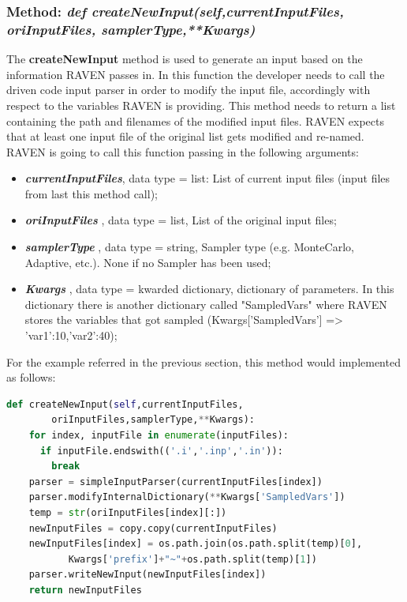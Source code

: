 \subsubsection{Method: \textit{def createNewInput(self,currentInputFiles,
                                       \\oriInputFiles, samplerType,**Kwargs)}} 
\label{subsubsec:generateCommand}
The \textbf{createNewInput} method is used to generate an input based 
on the information RAVEN passes in. In this function the developer needs to 
call the driven code input parser in order to modify the input file, accordingly with
respect to the variables RAVEN is providing. This method needs to return a list containing 
the path and filenames of the modified input files. \nb RAVEN expects that at least one input 
file of the original list gets modified and re-named.
\\RAVEN is going to call this function passing in the following arguments:
\begin{itemize}
  \item \textbf{\textit{currentInputFiles}}, data type = list: List of current 
              input files (input files from last this method call);
  \item \textbf{\textit{oriInputFiles}} , data type = list, List of the original input files; 
  \item  \textbf{\textit{samplerType}} , data type = string, Sampler type (e.g. MonteCarlo,
               Adaptive, etc.). \nb None if no Sampler has been used;
  \item  \textbf{\textit{Kwargs}} , data type = kwarded dictionary, dictionary of parameters.
               In this dictionary there is another dictionary
               called "SampledVars" where RAVEN stores the 
               variables that got sampled 
               (Kwargs['SampledVars'] => {'var1':10,'var2':40});
\end{itemize}
For the example referred in the previous section, this method would implemented as follows:
\newline
\begin{lstlisting}[language=python]
  def createNewInput(self,currentInputFiles,
        oriInputFiles,samplerType,**Kwargs):
    for index, inputFile in enumerate(inputFiles):
      if inputFile.endswith(('.i','.inp','.in')):
        break
    parser = simpleInputParser(currentInputFiles[index])
    parser.modifyInternalDictionary(**Kwargs['SampledVars'])
    temp = str(oriInputFiles[index][:])
    newInputFiles = copy.copy(currentInputFiles)
    newInputFiles[index] = os.path.join(os.path.split(temp)[0],
           Kwargs['prefix']+"~"+os.path.split(temp)[1])
    parser.writeNewInput(newInputFiles[index])
    return newInputFiles
\end{lstlisting} 
